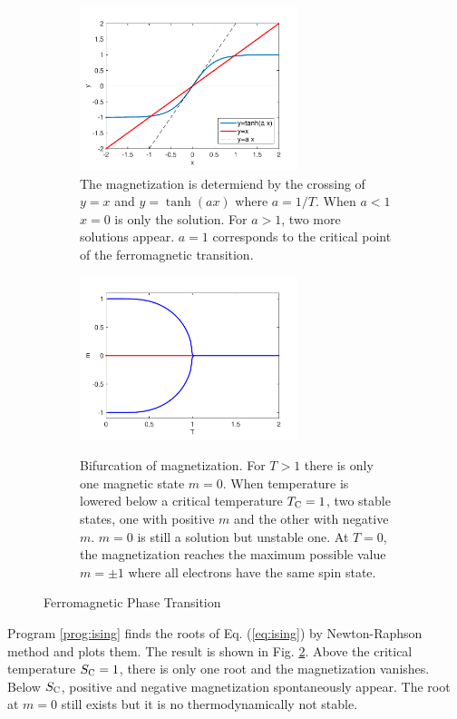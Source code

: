 \begin{figure}
\centering
	\begin{subfigure}{0.45\textwidth}
		\centering
		\includegraphics[width=2.5in]{04.root-finding/ising.pdf}
\caption{The magnetization is determiend by the crossing of $y=x$ and $y=\tanh(a x)$ where $a=1/T$. When $a<1$ $x=0$ is only the solution. For $a>1$, two more solutions appear.  $a=1$ corresponds to the critical point of the ferromagnetic transition.}\label{fig:ising-roots}
	\end{subfigure}
	\begin{subfigure}{0.45\textwidth}
		\centering
		\includegraphics[width=2.5in]{04.root-finding/ising-bifurcation.pdf}
\caption{Bifurcation of magnetization. For $T>1$ there is only one magnetic state $m=0$.  When temperature is lowered below a critical temperature $T_\textsc{C}=1$, two stable states, one with positive $m$ and the other with negative $m$.  $m=0$ is still a solution but unstable one. At $T=0$, the magnetization reaches the maximum possible value $m=\pm 1$ where all electrons have the same spin state.}{\label{fig:ising-bifurcation}}
	\end{subfigure}
\caption{Ferromagnetic Phase Transition}\label{fig:ising}
\end{figure}

\begin{example}
Program \ref{prog:ising} finds the roots of Eq. (\ref{eq:ising}) by Newton-Raphson method and plots them. The result is shown in Fig. \ref{fig:ising-bifurcation}.  Above the critical temperature $S_\textsc{C}=1$, there is only one root and the magnetization vanishes.
Below $S_\textsc{C}$, positive and negative magnetization spontaneously appear.  The root at $m=0$ still exists but it is no thermodynamically not stable. 
\end{example}

